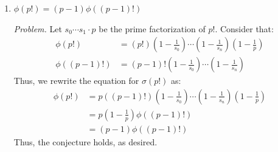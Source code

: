 \documentclass[10pt,oneside]{book}
\newcommand{\gspc}{\vspace{0.13cm}} %
\let\endoldproof\endproof
\newenvironment{problem}[1]
  {\vspace{-0.1cm}\begin{coloredadjust}\begin{adjustwidth}{2em}{2em}
   \textit{Problem. }#1}
  {\endoldproof
\end{adjustwidth}\end{coloredadjust}\gspc}
\begin{document}
\begin{enumerate}
\begin{enumerate}
\begin{enumerate}
\begin{problem}
				Consider that $\sigma(p!)$ represents the sum of all the divisors of $p!$. Let $s_0^{k_0}\cdots s_n^{k_n}$ be the prime factorization of $p!$. We thus have that:
				\begin{align*}
					\sigma(p!)=\frac{s_0\cdot s_0^{k_0} - 1}{{s_0-1}}\cdots \frac{s_n\cdot s_n^{k_n} - 1}{s_n -1}\cdot\frac{p^2 - 1}{p-1}
				\end{align*}
				Because $p$ adds a completely new prime to the prime factorization, and doesn't contribute to any more exponents, we write:
				\begin{align*}
					\sigma(p!)&=\sigma((p-1)!)\cdot \frac{p^2 - 1}{p-1}\\
					&= \sigma((p-1)!)\cdot \frac{(p+1)(p-1)}{p-1}\\
					&= \sigma((p-1)!)\cdot (p+1)
				\end{align*}
				Thus the conjecture holds.
			\end{problem}
			\item $\phi(p!)=(p-1)\phi((p-1)!)$
			\begin{problem}
				Let $s_0\cdots s_1\cdot p$ be the prime factorization of $p!$. Consider that:
				\begin{align*}
					\phi(p!) &= (p!)\left(1-\frac{1}{s_0}\right)\cdots\left(1-\frac{1}{s_n}\right)\left(1-\frac{1}{p}\right)\\
					\phi\left(\left(p-1\right)!\right) &= \left(p-1\right)!\left(1-\frac{1}{s_0}\right)\cdots\left(1-\frac{1}{s_n}\right)
				\end{align*}
				Thus, we rewrite the equation for $\sigma\left(p!\right)$ as:
				\begin{align*}
					\phi\left(p!\right) &= p\left(\left(p-1\right)!\right)\left(1-\frac{1}{s_0}\right)\cdots\left(1-\frac{1}{s_n}\right)\left(1-\frac{1}{p}\right)\\
					&= p\left(1-\frac{1}p\right)\phi\left(\left(p-1\right)!\right)\\
					&= \left(p-1\right)\phi\left(\left(p-1\right)!\right)
				\end{align*}
				Thus, the conjecture holds, as desired. 
			\end{problem}
		\end{enumerate}
	\end{enumerate}
\end{enumerate}
\end{document}
